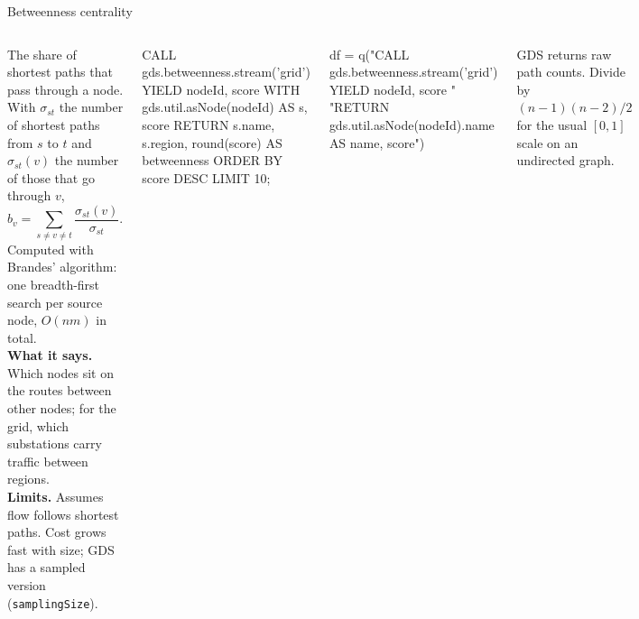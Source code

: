 \documentclass[aspectratio=169, 10pt]{beamer}
\newcommand{\kicker}[1]{{\color{muted}\small #1}}
\begin{document}
\begin{frame}[fragile]{Betweenness centrality}
  \vspace{0.1cm}
  \begin{columns}[T]
      \small
      The share of shortest paths that pass through a node. With $\sigma_{st}$ the number of shortest paths from $s$ to $t$ and $\sigma_{st}(v)$ the number of those that go through $v$,
      \[ b_v = \sum_{s \neq v \neq t} \frac{\sigma_{st}(v)}{\sigma_{st}} . \]
      Computed with Brandes' algorithm: one breadth-first search per source node, $O(nm)$ in total.\\[5pt]
      \textbf{What it says.} Which nodes sit on the routes between other nodes; for the grid, which substations carry traffic between regions.\\[5pt]
      \textbf{Limits.} Assumes flow follows shortest paths. Cost grows fast with size; GDS has a sampled version (\texttt{samplingSize}).
      \begin{code}
CALL gds.betweenness.stream('grid')
YIELD nodeId, score
WITH gds.util.asNode(nodeId) AS s, score
RETURN s.name, s.region, round(score) AS betweenness
ORDER BY score DESC LIMIT 10;
      \end{code}
      \begin{codesmall}[Python]
df = q("CALL gds.betweenness.stream('grid') YIELD nodeId, score "
       "RETURN gds.util.asNode(nodeId).name AS name, score")
      \end{codesmall}
      \kicker{GDS returns raw path counts. Divide by $(n-1)(n-2)/2$ for the usual $[0,1]$ scale on an undirected graph.}
  \end{columns}
\end{frame}
\end{document}
